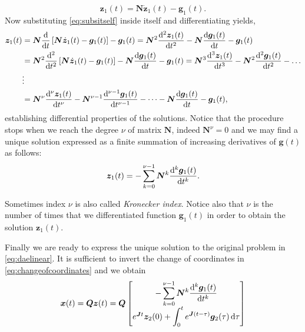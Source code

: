 		\begin{equation}
			\label{eq:subsitself}
			\bm{z}_{1}(t) = \bm{N}\dot{\bm{z}}_{1}(t) - \bm{g}_{1}(t).
		\end{equation}
		Now substituting \cref{eq:subsitself} inside itself and 
		differentiating yields,
		\begin{subequations}
			\begin{align*}
				\bm{z}_{1}(t) &= 
				\bm{N}\frac{\diff}{\diff t}\left[\bm{N}\dot{\bm{z}}_{1}(t)
				-\bm{g}_{1}(t)\right]-\bm{g}_{1}(t)
				= \bm{N}^{2}\frac{\diff^{2}\bm{z}_{1}(t)}{\diff t^{2}}
				-\bm{N}\frac{\diff \bm{g}_{1}(t)}{\diff t}-\bm{g}_{1}(t) \\
				&= \bm{N}^{2}\frac{\diff^{2}}{\diff t^{2}}\left[\bm{N}
				\dot{\bm{z}}_{1}(t)-\bm{g}_{1}(t)\right]-\bm{N}
				\frac{\diff \bm{g}_{1}(t)}{\diff t}-\bm{g}_{1}(t)
				= \bm{N}^3\frac{\diff^{3}\bm{z}_{1}(t)}{\diff t^{3}}
				-\bm{N}^2\frac{\diff^{2} \bm{g}_{1}(t)}{\diff t^{2}}-\dots \\
				&\vdots \\
				& = \bm{N}^{\nu}\frac{\diff^{\nu}\bm{z}_{1}(t)}{\diff t^{\nu}}
				- \bm{N}^{\nu-1}\frac{\diff^{\nu-1}
				\bm{g}_{1}(t)}{\diff t^{\nu-1}}-\dots-\bm{N}
				\frac{\diff \bm{g}_{1}(t)}{\diff t} - \bm{g}_{1}(t),
			\end{align*}
		\end{subequations}
		establishing differential properties of the solutions.
		Notice that the procedure stops when we reach the degree 
		$\nu$ of matrix $\bm{N}$, indeed $\bm{N}^{\nu} = 0$
		and we may find a unique solution expressed as a finite
		summation of increasing derivatives of $\bm{g}(t)$ as follows:
		\begin{equation}
			\bm{z}_{1}(t) = -\sum_{k=0}^{\nu-1}\bm{N}^{k}\frac{\mathop{}\!\mathrm{d}^{k} \bm{g}_{1}(t)}{\mathop{}\!\mathrm{d} t^{k}}.
		\end{equation}
		\begin{remark}
			Sometimes index $\nu$ is also called \emph{Kronecker index}.
			Notice also that $\nu$ is the number of times that we
			differentiated function $\bm{g}_{1}(t)$ in order to
			obtain the solution $\bm{z}_{1}(t)$.
		\end{remark}
		Finally we are ready to express the unique solution to the
		original problem in \cref{eq:daelinear}.
		It is sufficient to invert the change of coordinates in
		\cref{eq:changeofcoordinates} and we obtain
		\begin{equation}
			\label{eq:solutionDAE}
			\bm{x}(t) = \bm{Q}\bm{z}(t) = \bm{Q}
			\begin{bmatrix}
				-\displaystyle\sum_{k=0}^{\nu-1}\bm{N}^{k}\frac{\mathop{}\!\mathrm{d}^{k} \bm{g}_{1}(t)}{\mathop{}\!\mathrm{d} t^{k}} \\
				e^{\bm{J}t}\bm{z}_{2}(0)+\displaystyle\int_{0}^{t}e^{\bm{J}(t-\tau)}\bm{g}_{2}(\tau)\mathop{}\!\mathrm{d}\tau
			\end{bmatrix}
		\end{equation}
